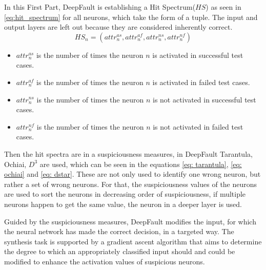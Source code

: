 In this First Part, DeepFault is establishing a Hit Spectrum($HS$) as seen in \ref{eq:hit_spectrum} for all neurons, which take the form of a tuple.
The input and output layers are left out because they are considered inherently correct.
\begin{equation}
    HS_n = (attr_n^{as}, attr_n^{af}, attr_n^{ns}, attr_n^{nf})\label{eq:hit_spectrum}
\end{equation}
\begin{itemize}
    \item $attr^{as}_n$ is the number of times the neuron $n$ is activated in successful test cases.
    \item $attr^{af}_n$ is the number of times the neuron $n$ is activated in failed test cases.
    \item $attr^{ns}_n$ is the number of times the neuron $n$ is not activated in successful test cases.
    \item $attr^{nf}_n$ is the number of times the neuron $n$ is not activated in failed test cases.
\end{itemize}
Then the hit spectra are in a suspiciousness measures, in DeepFault Tarantula, Ochiai, $D^3$ are used, which can be seen in the equations \ref{eq: tarantula}, \ref{eq: ochiai} and \ref{eq: dstar}.
These are not only used to identify one wrong neuron, but rather a set of wrong neurons.
For that, the suspiciousness values of the neurons are used to sort the neurons in decreasing order of suspiciousness, if multiple neurons happen to get the same value, the neuron in a deeper layer is used.

Guided by the suspiciousness measures, DeepFault modifies the input, for which the neural network has made the correct decision, in a targeted way.
The synthesis task is supported by a gradient ascent algorithm that aims to determine the degree to which an appropriately classified input should and could be modified to enhance the activation values of suspicious neurons.